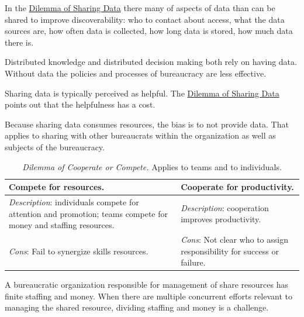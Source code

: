 In the \hyperref[table:data-share-vs-hide]{Dilemma of Sharing Data} there many of aspects of data than can be shared to improve discoverability: who to contact about access, what the data sources are, how often data is collected, how long data is stored, how much data there is.

Distributed knowledge and distributed decision making both rely on having data. Without data the policies and processes of bureaucracy are less effective. 

Sharing data is typically perceived as helpful. 
The \hyperref[table:data-share-vs-hide]{Dilemma of Sharing Data} points out that the helpfulness has a cost. 

Because sharing data consumes resources, the bias is to not provide data. That applies to sharing with other bureaucrats within the organization as well as subjects of the bureaucracy. 


\begin{center}
\begin{table}[H] %
\begin{tabular}{ | m{\dilemmatablewidth}| m{\dilemmatablewidth} | } 
  \hline
  \textbf{Compete for resources.} &
  \textbf{Cooperate for productivity.} \\
  \hline
  \textit{Description}: individuals compete for attention and promotion; teams compete for money and staffing resources. &
  \textit{Description}: cooperation improves productivity. \\  
  \hline
  \textit{Cons}: Fail to synergize skills resources. & 
  \textit{Cons}: Not clear who to assign responsibility for success or failure. \\
  \hline
\end{tabular}
\caption{
\textit{Dilemma of Cooperate or Compete.} 
Applies to teams and to individuals. 
}
\label{table:cooperate-vs-compete}
\end{table}
\end{center}


A bureaucratic organization responsible for management of share resources has finite staffing and money. When there are multiple concurrent efforts relevant to managing the shared resource,  dividing staffing and money is a challenge. 

